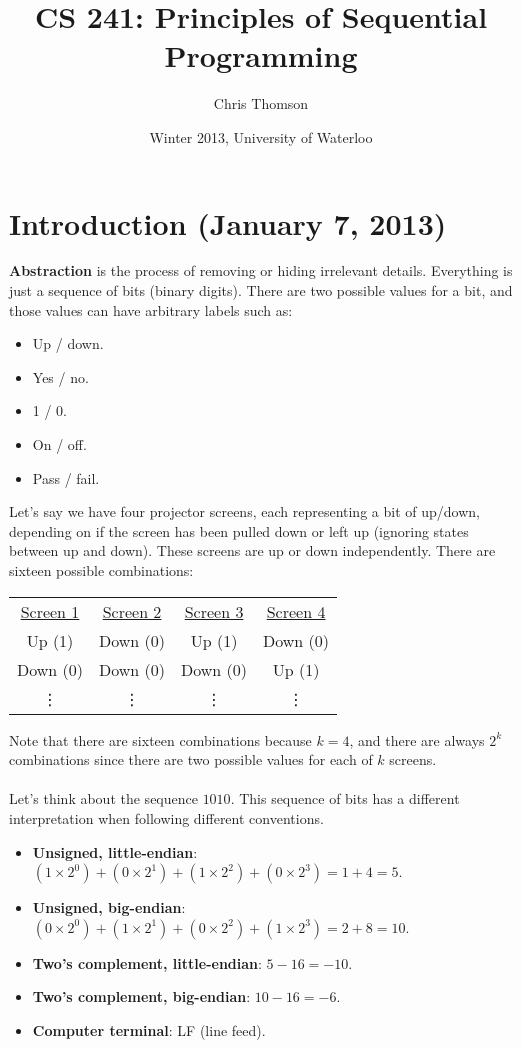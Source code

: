 \documentclass[]{article}
\begin{document}
\title{\bf{CS 241: Principles of Sequential Programming}}
\date{Winter 2013, University of Waterloo}
\author{Chris Thomson}
\maketitle
\newpage

\section{Introduction (January 7, 2013)}
	\textbf{Abstraction} is the process of removing or hiding irrelevant details. Everything is just a sequence of bits (binary digits). There are two possible values for a bit, and those values can have arbitrary labels such as:
	\begin{itemize}
		\item Up / down.
		\item Yes / no.
		\item 1 / 0.
		\item On / off.
		\item Pass / fail.
	\end{itemize}
	
	Let's say we have four projector screens, each representing a bit of up/down, depending on if the screen has been pulled down or left up (ignoring states between up and down). These screens are up or down independently. There are sixteen possible combinations: \\
	\begin{center}
		\begin{tabular}{cccc}
			\underline{Screen 1} & \underline{Screen 2} &\underline{Screen 3} & \underline{Screen 4} \\
			Up (1) & Down (0) & Up (1) & Down (0) \\
			Down (0) & Down (0) & Down (0) & Up (1) \\
			\vdots & \vdots & \vdots & \vdots \\
		\end{tabular}	
	\end{center}

	Note that there are sixteen combinations because $k = 4$, and there are always $2^k$ combinations since there are two possible values for each of $k$ screens.
	\\ \\
	Let's think about the sequence $1010$. This sequence of bits has a different interpretation when following different conventions.
	\begin{itemize}
		\item \textbf{Unsigned, little-endian}: $(1 \times 2^0) + (0 \times 2^1) + (1 \times 2^2) + (0 \times 2^3) = 1 + 4 = 5$.
		\item \textbf{Unsigned, big-endian}: $(0 \times 2^0) + (1 \times 2^1) + (0 \times 2^2) + (1 \times 2^3) = 2 + 8 = 10$.
		\item \textbf{Two's complement, little-endian}: $5 - 16 = -10$.
		\item \textbf{Two's complement, big-endian}: $10 - 16 = -6$.
		\item \textbf{Computer terminal}: LF (line feed). \\
	\end{itemize}
\end{document}
